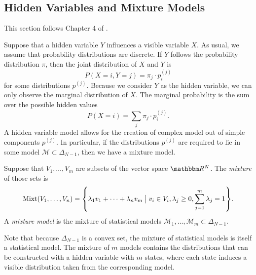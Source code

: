 \documentclass[11pt,titlepage]{article}
\newcommand*{\Mod}{\mathcal{M}}
\DeclareMathOperator{\Mixt}{Mixt}
\numberwithin{equation}{section}
\begin{document}
\subsection{Hidden Variables and Mixture Models}
    This section follows Chapter 4 of \cite{DSS08}.

    Suppose that a hidden variable $Y$ influences a visible variable $X$.  As
    usual, we assume that probability distributions are discrete.  If $Y$
    follows the probability distribution $\pi$, then the joint distribution of
    $X$ and $Y$ is 
    \[
        P(X = i, Y = j) = \pi_j \cdot p_i^{(j)}
    \]
    for some distributions $p^{(j)}$.  Because we consider $Y$ as the hidden
    variable, we can only observe the marginal distribution of $X$.  The
    marginal probability is the sum over the possible hidden values
    \[
        P(X = i) = \sum_{j} \pi_j \cdot p_i^{(j)}.
    \]
    A hidden variable model allows for the creation of complex model out of
    simple components $p^{(j)}$.  In particular, if the distributions $p^{(j)}$
    are required to lie in some model $\Mod \subset \Delta_{N-1}$, then we have
    a mixture model.
    \begin{definition}
    Suppose that $V_1, \ldots, V_m$ are subsets of the vector space $\R^N$.  The
    \emph{mixture} of those sets is 
    \[
        \Mixt(V_1, \ldots, V_n) = \cdil*{
            \lambda_1 v_1 + \cdots + \lambda_n v_m
            \;\big\vert\;
            v_i \in V_i, \lambda_j \ge 0, \sum_{j=1}^m \lambda_j = 1
        }.
    \]
    A \emph{mixture model} is the mixture of statistical models $\Mod_1, \ldots,
    \Mod_m \subset \Delta_{N-1}$.  
    \end{definition}
    Note that because $\Delta_{N-1}$ is a convex set, the mixture of statistical
    models is itself a statistical model.  The mixture of $m$ models contains
    the distributions that can be constructed with a hidden variable with $m$
    states, where each state induces a visible distribution taken from the
    corresponding model.
\end{document}
